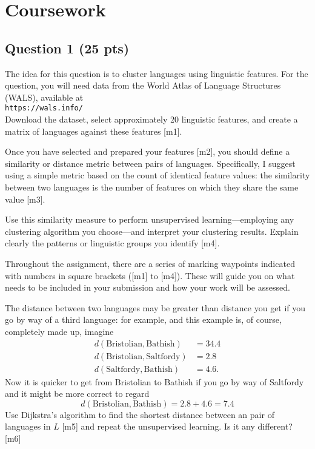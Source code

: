 \documentclass[12pt]{article}
\begin{document}
\section*{Coursework }

\subsection*{Question 1 (25 pts)}

The idea for this question is to cluster languages using linguistic
features. For the question, you will need data from the World Atlas of
Language Structures (WALS), available at\\[0.5cm]
\texttt{https://wals.info/}\\[0.5cm]
Download the dataset, select
approximately 20 linguistic features, and create a matrix of languages
against these features [m1].

Once you have selected and prepared your features [m2], you should
define a similarity or distance metric between pairs of
languages. Specifically, I suggest using a simple metric based on the
count of identical feature values: the similarity between two
languages is the number of features on which they share the same value
[m3].

Use this similarity measure to perform unsupervised learning—employing
any clustering algorithm you choose—and interpret your clustering
results. Explain clearly the patterns or linguistic groups you
identify [m4].

Throughout the assignment, there are a series of marking waypoints
indicated with numbers in square brackets ([m1] to [m4]). These will
guide you on what needs to be included in your submission and how your
work will be assessed.

The distance between two languages may be greater than distance you get if
you go by way of a third language: for example, and this example is, of course,
completely made up, imagine
\begin{align} 
  d(\text{Bristolian},\text{Bathish})&=34.4\\
  d(\text{Bristolian},\text{Saltfordy})&=2.8\\
  d(\text{Saltfordy},\text{Bathish})&=4.6.
\end{align}
Now it is quicker to get from Bristolian to Bathish if you go by way of Saltfordy and it might be more correct to regard
\begin{equation}
  d(\text{Bristolian},\text{Bathish})=2.8+4.6=7.4
\end{equation}
Use Dijkstra's algorithm to find the shortest distance between an pair
of languages in $L$ [m5] and repeat the unsupervised learning. Is it any
different? [m6]
\end{document}
